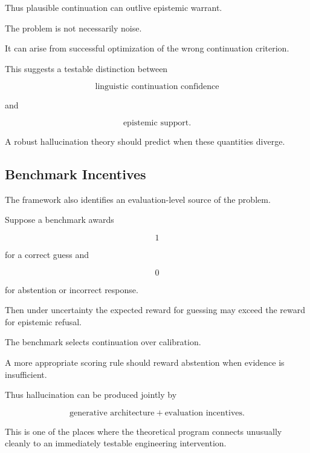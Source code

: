 \documentclass[11pt]{article}
\theoremstyle{remark}
\begin{document}
Thus plausible continuation can outlive epistemic warrant.

The problem is not necessarily noise.

It can arise from successful optimization of the wrong continuation criterion.

This suggests a testable distinction between

\begin{equation}
\text{linguistic continuation confidence}
\end{equation}

and

\begin{equation}
\text{epistemic support}.
\end{equation}

A robust hallucination theory should predict when these quantities diverge.

\subsection{Benchmark Incentives}

The framework also identifies an evaluation-level source of the problem.

Suppose a benchmark awards

\begin{equation}
1
\end{equation}

for a correct guess and

\begin{equation}
0
\end{equation}

for abstention or incorrect response.

Then under uncertainty the expected reward for guessing may exceed the reward for epistemic refusal.

The benchmark selects continuation over calibration.

A more appropriate scoring rule should reward abstention when evidence is insufficient.

Thus hallucination can be produced jointly by

\begin{equation}
\text{generative architecture}
+
\text{evaluation incentives}.
\end{equation}

This is one of the places where the theoretical program connects unusually cleanly to an immediately testable engineering intervention.
\end{document}
